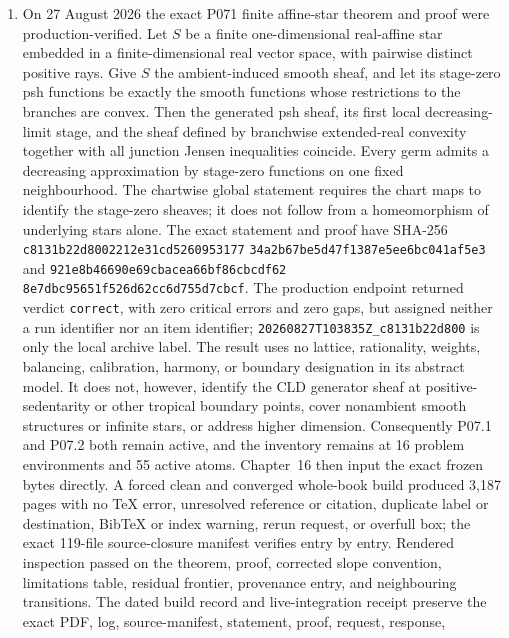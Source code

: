 \begin{enumerate}
  valid because it forbids positive curvature, whereas the new approximants
  use positive curvature in fresh directions.
\item On 27 August 2026 the exact P071 finite affine-star theorem and proof
  were production-verified.  Let \(S\) be a finite one-dimensional
  real-affine star embedded in a finite-dimensional real vector space, with
  pairwise distinct positive rays.  Give \(S\) the ambient-induced smooth
  sheaf, and let its stage-zero psh functions be exactly the smooth functions
  whose restrictions to the branches are convex.  Then the generated psh
  sheaf, its first local decreasing-limit stage, and the sheaf defined by
  branchwise extended-real convexity together with all junction Jensen
  inequalities coincide.  Every germ admits a decreasing approximation by
  stage-zero functions on one fixed neighbourhood.  The chartwise global
  statement requires the chart maps to identify the stage-zero sheaves; it
  does not follow from a homeomorphism of underlying stars alone.  The exact
  statement and proof have SHA-256
  \texttt{c8131b22d8002212e31cd5260953177}
  \allowbreak\texttt{34a2b67be5d47f1387e5ee6bc041af5e3} and
  \texttt{921e8b46690e69cbacea66bf86cbcdf62}
  \allowbreak\texttt{8e7dbc95651f526d62cc6d755d7cbcf}.  The production
  endpoint returned verdict \texttt{correct}, with zero critical errors and
  zero gaps, but assigned neither a run identifier nor an item identifier;
  \texttt{20260827T103835Z\_c8131b22d800} is only the local archive label.
  The result uses no lattice, rationality, weights, balancing, calibration,
  harmony, or boundary designation in its abstract model.  It does not,
  however, identify the CLD generator sheaf at positive-sedentarity or other
  tropical boundary points, cover nonambient smooth structures or infinite
  stars, or address higher dimension.  Consequently P07.1 and P07.2 both
  remain active, and the inventory remains at 16 problem environments and
  55 active atoms.  Chapter~16 then input the exact frozen bytes directly.
  A forced clean and converged whole-book build produced 3,187 pages with no
  TeX error, unresolved reference or citation, duplicate label or
  destination, BibTeX or index warning, rerun request, or overfull box; the
  exact 119-file source-closure manifest verifies entry by entry.  Rendered
  inspection passed on the theorem, proof, corrected slope convention,
  limitations table, residual frontier, provenance entry, and neighbouring
  transitions.  The dated build record and live-integration receipt preserve
  the exact PDF, log, source-manifest, statement, proof, request, response,

\end{enumerate}
